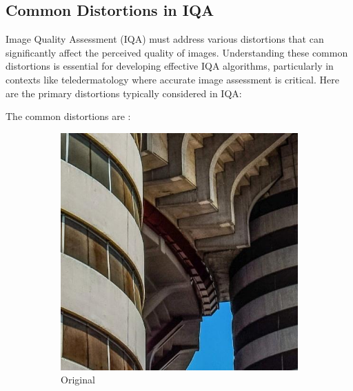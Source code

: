 \subsection{Common Distortions in IQA}
\label{sub:CommonDistortionsIQA}
Image Quality Assessment (IQA) must address various distortions that can significantly affect the perceived quality of images. Understanding these common distortions is essential for developing effective IQA algorithms, particularly in contexts like teledermatology where accurate image assessment is critical. Here are the primary distortions typically considered in IQA: \par
The common distortions are \cite{https://arxiv.org/abs/2310.14918}:
\begin{figure}[ht]
    \centering
    \begin{subfigure}[b]{0.24\textwidth}
        \includegraphics[width=\textwidth]{img/Original.jpg}
        \caption{Original}
    \end{subfigure}
    \hfill
    \begin{subfigure}[b]{0.24\textwidth}

\end{subfigure}
\end{figure}
